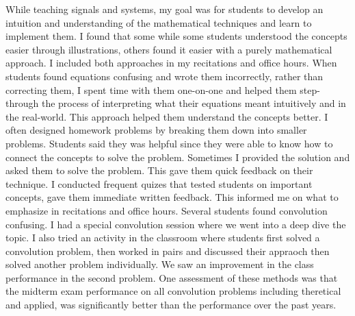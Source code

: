 \documentclass[10pt]{article}
\begin{document}
While teaching signals and systems, %
my goal was for students to develop an intuition and understanding of the mathematical techniques and learn to implement them. I found that some while some students understood the concepts easier through illustrations, others found it easier with a purely mathematical approach. I included both approaches in my recitations and office hours. When students found equations confusing and wrote them incorrectly, rather than correcting them, I spent time with them one-on-one and helped them step-through the process of interpreting what their equations meant intuitively and in the real-world. This approach helped them understand the concepts better. %
I often designed homework problems by breaking them down into smaller problems. Students said they was helpful since they were able to know how to connect the concepts to solve the problem. Sometimes I provided the solution and asked them to solve the problem. This gave them quick feedback on their technique.
I conducted frequent quizes that tested students on important concepts, gave them immediate written feedback. This informed me on what to emphasize in recitations and office hours.  Several students found convolution confusing. I had a special convolution session where we went into a deep dive the topic. I also tried an activity in the classroom where students first solved a convolution problem, then worked in pairs and discussed their appraoch then solved another problem individually. We saw an improvement in the class performance in the second problem. One assessment of these methods was that the midterm exam performance on all convolution problems including theretical and applied, was significantly better than the performance over the past years. \\
\end{document}
